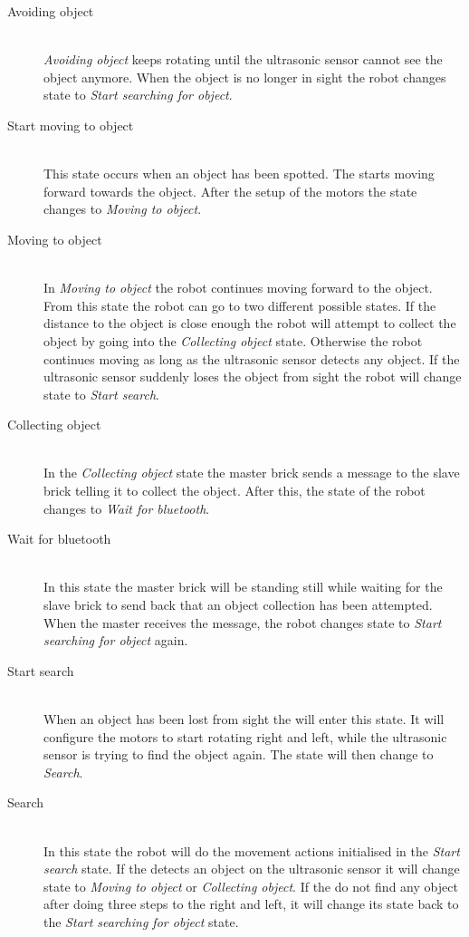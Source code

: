 \begin{description}
\item[Avoiding object] \hfill \\
\emph{Avoiding object} keeps rotating until the ultrasonic sensor cannot see the object anymore. When the object is no longer in sight the robot changes state to \emph{Start searching for object}.

\item[Start moving to object] \hfill \\
This state occurs when an object has been spotted. The \projname{} starts moving forward towards the object. After the setup of the motors the state changes to \emph{Moving to object}.

\item[Moving to object] \hfill \\
In \emph{Moving to object} the robot continues moving forward to the object. From this state the robot can go to two different possible states. If the distance to the object is close enough the robot will attempt to collect the object by going into the \emph{Collecting object} state. Otherwise the robot continues moving as long as the ultrasonic sensor detects any object. If the ultrasonic sensor suddenly loses the object from sight the robot will change state to \emph{Start search}.

\item[Collecting object] \hfill \\
In the \emph{Collecting object} state the master brick sends a message to the slave brick telling it to collect the object. After this, the state of the robot changes to \emph{Wait for bluetooth}.

\item[Wait for bluetooth] \hfill \\
In this state the master brick will be standing still while waiting for the slave brick to send back that an object collection has been attempted. When the master receives the message, the robot changes state to \emph{Start searching for object} again. 

\item[Start search] \hfill \\
When an object has been lost from sight the \projname{} will enter this state. It will configure the motors to start rotating right and left, while the ultrasonic sensor is trying to find the object again. The state will then change to \emph{Search}.

\item[Search] \hfill \\
In this state the robot will do the movement actions initialised in the \emph{Start search} state. If the \projname{} detects an object on the ultrasonic sensor it will change state to \emph{Moving to object} or \emph{Collecting object}. If the \projname{} do not find any object after doing three steps to the right and left, it will change its state back to the \emph{Start searching for object} state. 

\end{description}
